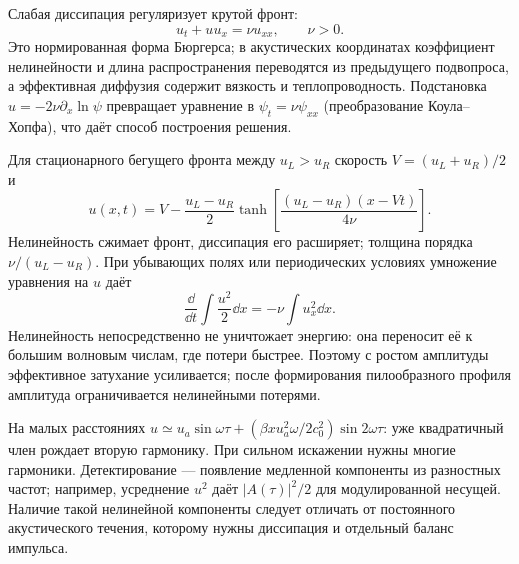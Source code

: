 
Слабая диссипация регуляризует крутой фронт:
\begin{equation}\label{eq:burgers}
 u_t+u u_x=\nu u_{xx},\qquad \nu>0.
\end{equation}
Это нормированная форма Бюргерса; в акустических координатах коэффициент нелинейности и длина распространения переводятся из предыдущего подвопроса, а эффективная диффузия содержит вязкость и теплопроводность. Подстановка $u=-2\nu\partial_x\ln\psi$ превращает уравнение в $\psi_t=\nu\psi_{xx}$ (преобразование Коула–Хопфа), что даёт способ построения решения.

Для стационарного бегущего фронта между $u_L>u_R$ скорость $V=(u_L+u_R)/2$ и
\begin{equation}
 u(x,t)=V-\frac{u_L-u_R}{2}\tanh\left[\frac{(u_L-u_R)(x-Vt)}{4\nu}\right].
\end{equation}
Нелинейность сжимает фронт, диссипация его расширяет; толщина порядка $\nu/(u_L-u_R)$. При убывающих полях или периодических условиях умножение уравнения на $u$ даёт
\begin{equation}
 \frac{\dd}{\dd t}\int\frac{u^2}{2}\dd x=-\nu\int u_x^2\dd x.
\end{equation}
Нелинейность непосредственно не уничтожает энергию: она переносит её к большим волновым числам, где потери быстрее. Поэтому с ростом амплитуды эффективное затухание усиливается; после формирования пилообразного профиля амплитуда ограничивается нелинейными потерями.

На малых расстояниях $u\simeq u_a\sin\omega\tau+(\beta xu_a^2\omega/2c_0^2)\sin2\omega\tau$: уже квадратичный член рождает вторую гармонику. При сильном искажении нужны многие гармоники. Детектирование — появление медленной компоненты из разностных частот; например, усреднение $u^2$ даёт $|A(\tau)|^2/2$ для модулированной несущей. Наличие такой нелинейной компоненты следует отличать от постоянного акустического течения, которому нужны диссипация и отдельный баланс импульса.

